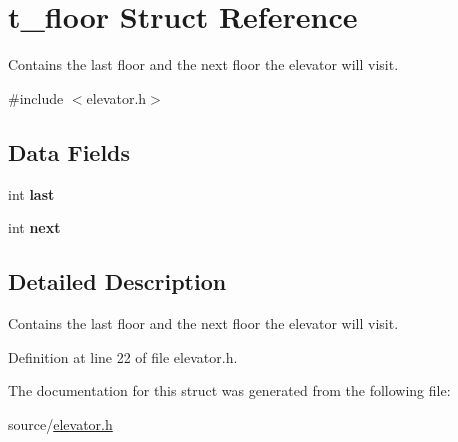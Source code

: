 \hypertarget{structt__floor}{}\section{t\+\_\+floor Struct Reference}
\label{structt__floor}


Contains the last floor and the next floor the elevator will visit.  




{\ttfamily \#include $<$elevator.\+h$>$}

\subsection*{Data Fields}
\begin{DoxyCompactItemize}
\item 
int {\bfseries last}\hypertarget{structt__floor_ac7106a034da33a30e4bbac53b7ae9883}{}\label{structt__floor_ac7106a034da33a30e4bbac53b7ae9883}

\item 
int {\bfseries next}\hypertarget{structt__floor_af5f488e9cfc49388b0b2c58d31ef50ee}{}\label{structt__floor_af5f488e9cfc49388b0b2c58d31ef50ee}

\end{DoxyCompactItemize}


\subsection{Detailed Description}
Contains the last floor and the next floor the elevator will visit. 

Definition at line 22 of file elevator.\+h.



The documentation for this struct was generated from the following file\+:\begin{DoxyCompactItemize}
\item 
source/\hyperlink{elevator_8h}{elevator.\+h}\end{DoxyCompactItemize}
